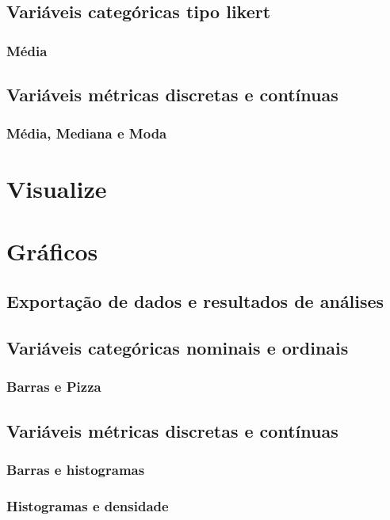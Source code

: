 \documentclass[a4paper,12pt]{article}
\begin{document}
\subsection*{Variáveis categóricas tipo likert}
\subsubsection*{Média}

\subsection*{Variáveis métricas discretas e contínuas}
\subsubsection*{Média, Mediana e Moda}

\section{Visualize}
\section*{Gráficos}

\subsection*{Exportação de dados e resultados de análises}
\subsection*{Variáveis categóricas nominais e ordinais}
\subsubsection*{Barras e Pizza}

\subsection*{Variáveis métricas discretas e contínuas}
\subsubsection*{Barras e histogramas}
\subsubsection*{Histogramas e densidade}
\end{document}
